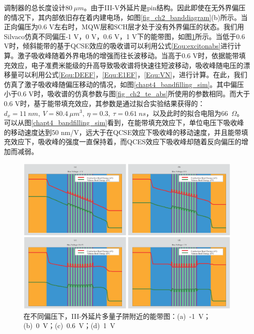调制器的总长度设计$80~\mu m$。由于III-V外延片是pin结构。因此即使在无外界偏压的情况下，其内部依旧存在着内建电场，如图\ref{fig_ch2_banddiagram}(b)所示。当正向偏压为0.6 V左右时，MQW层和SCH层才处于没有外界偏压的状态。我们用Silvaco\cite{Silvaco}仿真不同偏压-1 V，0 V，0.6 V，1 V下的能带图，如图\ref{chapt4_band_diagram}所示。当低于0.6 V时，倾斜能带的基于QCSE效应的吸收谱可以利用公式\ref{Equ:excitonabs}进行计算。激子吸收峰随着外界电场的增强而往长波移动。当高于0.6 V时，依据能带填充效应，电子准费米能级的升高导致吸收谱将快速往短波移动，吸收峰随电压的漂移量可以利用公式\ref{Equ:DEEF}，\ref{Equ:E1EF}，\ref{Equ:VN}，进行计算。在此，我们仿真了激子吸收峰随偏压移动的情况，如图\ref{chapt4_bandfilling_sim}。其中偏压小于0.6 V时，吸收谱的仿真参数与图\ref{fig_ch2_te_abs}所使用的参数相同。而大于0.6 V时，基于能带填充效应，其参数是通过拟合实验结果获得的：$d_x = 11~nm,~V = 80.4~\mu m^3,~\eta = 0.3,~\tau = 0.61~ns$，以及此时的拟合电阻为66~$\Omega$。可以从图\ref{chapt4_bandfilling_sim}看到，在能带填充效应下，单位电压下吸收峰的移动速度达到50 nm/V，远大于在QCSE效应下吸收峰的移动速度，并且能带填充效应下，吸收峰的强度一直保持着，而QCES效应下吸收峰却随着反向偏压的增加而减弱。
\begin{figure}[htb]
	\centering
	\includegraphics[width=14cm]{./Pictures/chapt4_band_diagram.eps}
	\caption{在不同偏压下，III-外延片多量子阱附近的能带图：(a)~-1~V；(b)~0~V；(c)~0.6~V；(d)~1~V}
	\label{chapt4_band_diagram}
\end{figure}

